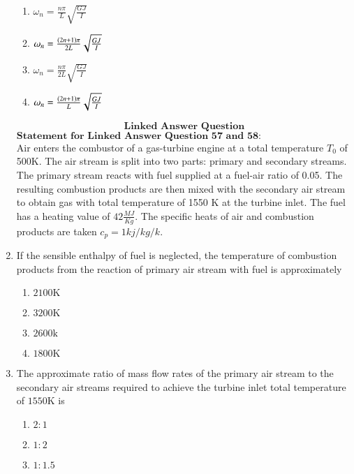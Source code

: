 \documentclass[journal]{IEEEtran}
\begin{document}
\begin{enumerate}[start=49]
\begin{multicols}{2}
    \begin{enumerate}
        \item $\omega_{n}=\frac{n\pi}{L}\sqrt{\frac{GJ}{I}}$
        \item $\omega_{n}=\frac{\left(2n+1\right)\pi}{2L}\sqrt{\frac{GJ}{I}}$
        \item $\omega_{n}=\frac{n\pi}{2L}\sqrt{\frac{GJ}{I}}$
        \item $\omega_{n}=\frac{\left(2n+1\right)\pi}{L}\sqrt{\frac{GJ}{I}}$        
    \end{enumerate}
\end{multicols}    
\bigskip
$$\textbf{Linked Answer Question}$$
$\textbf{Statement for Linked Answer Question 57 and 58:}$\\
Air enters the combustor of a gas-turbine engine at a total temperature $T_{0}$ of 500K. The air stream is split into two parts: primary and secondary streams. The primary stream reacts with fuel supplied at a fuel-air ratio of 0.05. The resulting combustion products are then mixed with the secondary air stream to obtain gas with total temperature of 1550 K at the turbine inlet. The fuel has a heating value of $42 \frac{MJ}{Kg}.$ The specific heats of air and combustion products are taken $c_{p}=1kj/kg/k.$\bigskip
\item If the sensible enthalpy of fuel is neglected, the temperature of combustion products from the reaction of primary air stream with fuel is approximately
\begin{multicols}{4}
    \begin{enumerate}
        \item $2100\text{K}$
        \item $3200\text{K}$
        \item $2600\text{k}$
        \item $1800\text{K}$        
    \end{enumerate}
\end{multicols}    
\bigskip
\item The approximate ratio of mass flow rates of the primary air stream to the secondary air streams required to achieve the turbine inlet total temperature of $1550\text{K}$ is 
\begin{multicols}{4}
    \begin{enumerate}
        \item $2:1$
        \item $1:2$
        \item $1:1.5$

\end{enumerate}
\end{multicols}
\end{enumerate}
\end{document}
